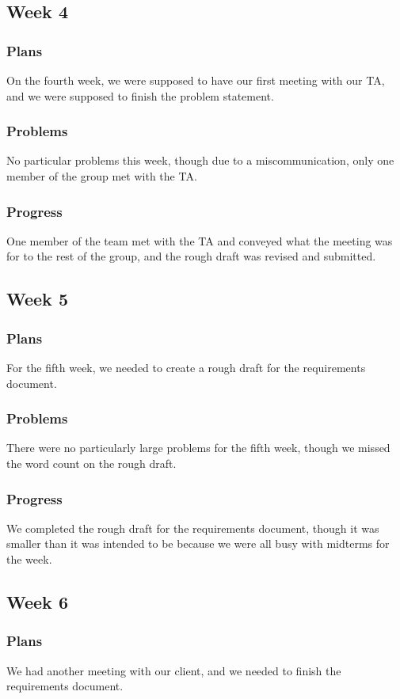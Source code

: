 \documentclass[onecolumn, draftclsnofoot, 10pt, compsoc]{IEEEtran}
\begin{document}
\subsection{Week 4}
\subsubsection{Plans}
On the fourth week, we were supposed to have our first meeting with our TA, and we were supposed to finish the problem statement.
\subsubsection{Problems}
No particular problems this week, though due to a miscommunication, only one member of the group met with the TA.
\subsubsection{Progress}
One member of the team met with the TA and conveyed what the meeting was for to the rest of the group, and the rough draft was revised and submitted. 

\subsection{Week 5}
\subsubsection{Plans}
For the fifth week, we needed to create a rough draft for the requirements document.
\subsubsection{Problems}
There were no particularly large problems for the fifth week, though we missed the word count on the rough draft.
\subsubsection{Progress}
We completed the rough draft for the requirements document, though it was smaller than it was intended to be because we were all busy with midterms for the week.

\subsection{Week 6}
\subsubsection{Plans}
We had another meeting with our client, and we needed to finish the requirements document.
\end{document}
